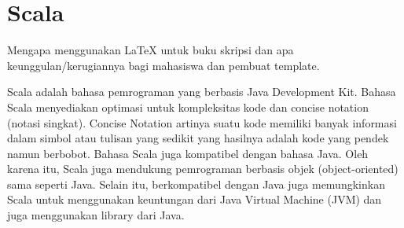 \section{Scala}
\label{sec:scala}

Mengapa menggunakan \LaTeX{} untuk buku skripsi dan apa keunggulan/kerugiannya bagi mahasiswa dan pembuat template. 

Scala adalah bahasa pemrograman yang berbasis Java Development Kit. Bahasa Scala menyediakan optimasi untuk kompleksitas kode dan concise notation (notasi singkat). Concise Notation artinya suatu kode memiliki banyak informasi dalam simbol atau tulisan yang sedikit   yang hasilnya adalah kode yang pendek namun berbobot. Bahasa Scala juga kompatibel dengan bahasa Java. Oleh karena itu, Scala juga mendukung pemrograman berbasis objek (object-oriented) sama seperti Java. Selain itu, berkompatibel dengan Java juga memungkinkan Scala untuk menggunakan keuntungan dari Java Virtual Machine (JVM) dan juga menggunakan library dari Java.

